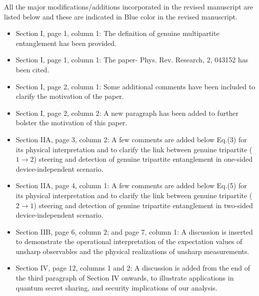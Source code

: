 \documentclass[12pt,showpacs,bibnotes,prl,onecolumn]{revtex4}
\begin{document}
All the major modifications/additions incorporated in the revised manuscript are listed below  and these are indicated in Blue color in the revised manuscript.
\begin{itemize}
\item Section I, page 1, column 1: The definition of genuine multipartite entanglement has been provided.
\item Section I, page 1, column 1:  The paper- Phys. Rev. Research, 2, 043152 has been  cited.
\item Section I, page 2, column 1: Some additional comments have been included  to  clarify the motivation of the paper.
\item Section I, page 2, column 2: A new paragraph has been added  to further
bolster the motivation of this paper.
\item Section IIA, page 3, column 2: A few comments are added below Eq.(3) for its physical interpretation and to clarify the link between genuine tripartite ($1 \rightarrow 2$) steering and detection of genuine tripartite entanglement in one-sided device-independent scenario.
\item Section IIA, page 4, column 1: A few comments are added below Eq.(5) for its physical interpretation  and to clarify the link between genuine tripartite ($2 \rightarrow 1$) steering and detection of genuine tripartite entanglement in two-sided device-independent scenario.
\item Section IIB, page 6, column 2; and page 7, column 1: A discussion is inserted to demonstrate the operational interpretation of the expectation values of unsharp observables and the physical realizations of unsharp measurements. 
\item Section IV, page 12, columns 1 and 2: A discussion is added from the end of the third paragraph of Section IV onwards,   to illustrate applications in quantum secret sharing, and security implications of our analysis.


\end{itemize}
\end{document}
